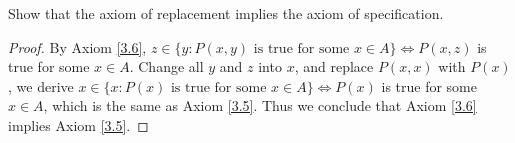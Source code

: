 \begin{exercise}\label{ex 3.1.11}
Show that the axiom of replacement implies the axiom of specification.
\end{exercise}

\begin{proof}
By Axiom \ref{3.6}, \(z \in \{y : P(x, y) \text{ is true for some } x \in A\} \iff P(x, z)\) is true for some \(x \in A\).
Change all \(y\) and \(z\) into \(x\), and replace \(P(x, x)\) with \(P(x)\), we derive \(x \in \{x : P(x) \text{ is true for some } x \in A\} \iff P(x)\) is true for some \(x \in A\), which is the same as Axiom \ref{3.5}.
Thus we conclude that Axiom \ref{3.6} implies Axiom \ref{3.5}.
\end{proof}
